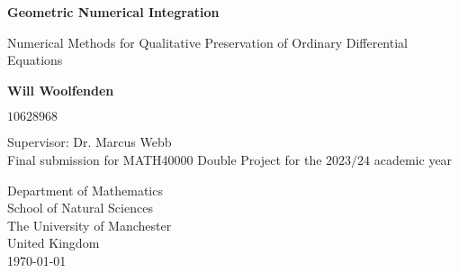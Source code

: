 \begin{titlepage}
    \begin{center}
        \vspace*{1cm}
            
        \Huge
        \textbf{Geometric Numerical Integration}
            
        \vspace{0.5cm}
        \LARGE
        Numerical Methods for Qualitative Preservation of Ordinary Differential Equations
            
        \vspace{1.5cm}
            
        \textbf{Will Woolfenden}
        
        \vspace{0.5cm}
        
        $10628968$
            
        \vfill

        Supervisor: Dr. Marcus Webb \\

        \vspace{0.8cm}
        Final submission for MATH40000 Double Project for the $2023/24$ academic year
            
        \vspace{0.8cm}
            
        \Large
        
        Department of Mathematics \\
        School of Natural Sciences\\
        The University of Manchester\\
        United Kingdom\\
        \today
    \end{center}
\end{titlepage}